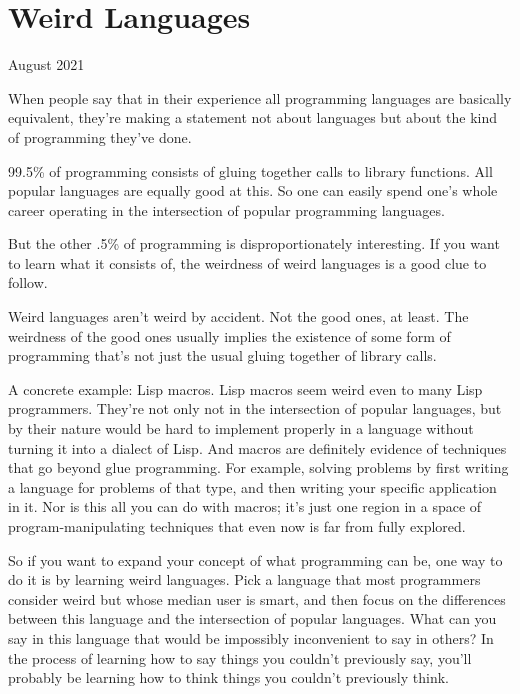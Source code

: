 \chapter{Weird Languages}


            
              
                

August 2021

When people say that in their
                  experience all programming languages are basically equivalent,
                  they're making a statement not about languages but about the
                  kind of programming they've done.

99.5\% of
                  programming consists of gluing together calls to library
                  functions. All popular languages are equally good at this. So
                  one can easily spend one's whole career operating in the
                  intersection of popular programming languages.

But
                  the other .5\% of programming is disproportionately
                  interesting. If you want to learn what it consists of, the
                  weirdness of weird languages is a good clue to follow.

Weird
                  languages aren't weird by accident. Not the good ones, at
                  least. The weirdness of the good ones usually implies the
                  existence of some form of programming that's not just the
                  usual gluing together of library calls.

A concrete
                  example: Lisp macros. Lisp macros seem weird even to many Lisp
                  programmers. They're not only not in the intersection of
                  popular languages, but by their nature would be hard to
                  implement properly in a language without turning it into a
                  dialect of Lisp. And macros are definitely evidence of
                  techniques that go beyond glue programming. For example,
                  solving problems by first writing a language for problems of
                  that type, and then writing your specific application in it.
                  Nor is this all you can do with macros; it's just one region
                  in a space of program-manipulating techniques that even now is
                  far from fully explored.

So if you want to expand
                  your concept of what programming can be, one way to do it is
                  by learning weird languages. Pick a language that most
                  programmers consider weird but whose median user is smart, and
                  then focus on the differences between this language and the
                  intersection of popular languages. What can you say in this
                  language that would be impossibly inconvenient to say in
                  others? In the process of learning how to say things you
                  couldn't previously say, you'll probably be learning how to
                  think things you couldn't previously think.








